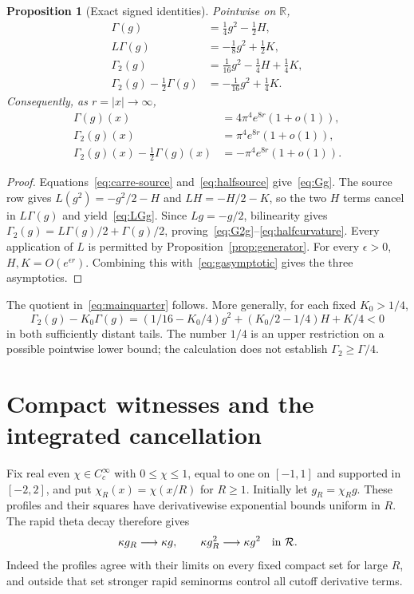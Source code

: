 \documentclass[11pt,a4paper]{article}
\numberwithin{equation}{section}
\newtheorem{proposition}[theorem]{Proposition}
\theoremstyle{definition}
\theoremstyle{remark}
\newcommand{\R}{\mathbb R}
\newcommand{\RR}{\mathcal R}
\begin{document}
\begin{proposition}[Exact signed identities]\label{prop:quarteridentities}
Pointwise on $\R$,
\begin{align}
 \Gamma(g)&=\tfrac14g^2-\tfrac12H,\label{eq:Gg}\\
 L\Gamma(g)&=-\tfrac18g^2+\tfrac12K,\label{eq:LGg}\\
 \Gamma_2(g)&=\tfrac1{16}g^2-\tfrac14H+\tfrac14K,\label{eq:G2g}\\
 \Gamma_2(g)-\tfrac12\Gamma(g)&=-\tfrac1{16}g^2+\tfrac14K.\label{eq:halfcurvature}
\end{align}
Consequently, as $r=|x|\to\infty$,
\begin{align}
 \Gamma(g)(x)&=4\pi^4e^{8r}(1+o(1)),\label{eq:Gtail}\\
 \Gamma_2(g)(x)&=\pi^4e^{8r}(1+o(1)),\label{eq:G2tail}\\
 \Gamma_2(g)(x)-\tfrac12\Gamma(g)(x)&=-\pi^4e^{8r}(1+o(1)).\label{eq:deftail}
\end{align}
\end{proposition}
\begin{proof}
Equations~\eqref{eq:carre-source} and~\eqref{eq:halfsource} give~\eqref{eq:Gg}. The source row gives $L(g^2)=-g^2/2-H$ and $LH=-H/2-K$, so the two $H$ terms cancel in $L\Gamma(g)$ and yield~\eqref{eq:LGg}. Since $Lg=-g/2$, bilinearity gives
$\Gamma_2(g)=L\Gamma(g)/2+\Gamma(g)/2$, proving~\eqref{eq:G2g}--\eqref{eq:halfcurvature}. Every application of $L$ is permitted by Proposition~\ref{prop:generator}. For every $\epsilon>0$, $H,K=O(e^{\epsilon r})$. Combining this with~\eqref{eq:gasymptotic} gives the three asymptotics.
\end{proof}

The quotient in~\eqref{eq:mainquarter} follows. More generally, for each fixed $K_0>1/4$,
\begin{equation}\label{eq:anycurvature}
 \Gamma_2(g)-K_0\Gamma(g)
  =(1/16-K_0/4)g^2+(K_0/2-1/4)H+K/4<0
\end{equation}
in both sufficiently distant tails. The number $1/4$ is an upper restriction on a possible pointwise lower bound; the calculation does not establish $\Gamma_2\ge\Gamma/4$.

\section{Compact witnesses and the integrated cancellation}\label{sec:cutoffs}

Fix real even $\chi\in C_c^\infty$ with $0\le\chi\le1$, equal to one on $[-1,1]$ and supported in $[-2,2]$, and put $\chi_R(x)=\chi(x/R)$ for $R\ge1$. Initially let $g_R=\chi_Rg$. These profiles and their squares have derivativewise exponential bounds uniform in $R$. The rapid theta decay therefore gives
\begin{equation}\label{eq:rapidcutoffs}
 \kappa g_R\longrightarrow\kappa g,\qquad
 \kappa g_R^2\longrightarrow\kappa g^2
 \quad\hbox{in }\RR.
\end{equation}
Indeed the profiles agree with their limits on every fixed compact set for large $R$, and outside that set stronger rapid seminorms control all cutoff derivative terms.
\end{document}
